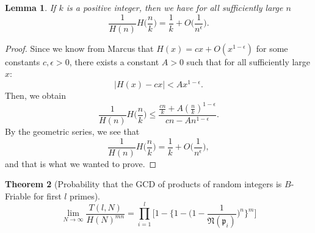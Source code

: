 \documentclass[10pt,a4paper]{article}
\newtheorem{theorem}{Theorem}[section]
\newtheorem{lemma}[theorem]{Lemma}
\theoremstyle{definition}
\theoremstyle{remark}
\newcommand{\f}[1]{\mathfrak{#1}}
\begin{document}
\begin{lemma} If $k$ is a positive integer, then we have for all sufficiently large $n$
$$\frac{1}{H(n)} H\Big(\frac{n}{k}\Big) = \frac{1}{k} + O\Big(\frac{1}{n^{\epsilon}}\Big).$$
\end{lemma}

\begin{proof}
Since we know from Marcus that $H(x) = cx + O(x^{1-\epsilon})$ for some constants $c, \epsilon > 0$, there exists a constant $A > 0$ such that for all sufficiently large $x$:
$$|H(x) - cx| < Ax^{1-\epsilon}.$$
Then, we obtain
$$\frac{1}{H(n)} H\Big(\frac{n}{k}\Big) \leq \frac{\frac{cn}{k} + A(\frac{n}{k})^{1-\epsilon}}{cn - An^{1-\epsilon}}.$$
By the geometric series, we see that
$$\frac{1}{H(n)} H\Big(\frac{n}{k}\Big) = \frac{1}{k} + O\Big(\frac{1}{n^{\epsilon}}\Big),$$
and that is what we wanted to prove.
\end{proof}


	\begin{theorem}[Probability that the GCD of products of random integers is \(B\)-Friable for first \(l\) primes]
		\begin{equation}
			\lim\limits_{N\to\infty}\frac{T(l,N)}{H(N)^{mn}} =\prod_{i=1}^{l}\Biggr[1-\Biggr\{1-\Biggl(1-\frac{1}{\f{N}(\f{p}_i)}\Biggr)^n\Biggr\}^m\Biggr]
		\end{equation}
	\end{theorem}
\end{document}
